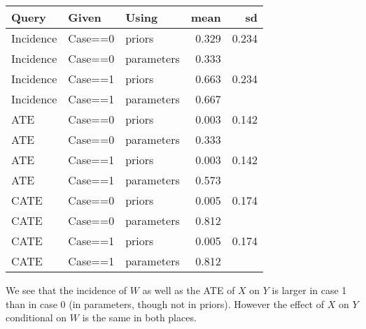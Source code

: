 \documentclass[
  12pt,
]{book}
\newenvironment{Shaded}{\begin{snugshade}}{\end{snugshade}}
\newcommand{\DataTypeTok}[1]{\textcolor[rgb]{0.13,0.29,0.53}{#1}}
\newcommand{\KeywordTok}[1]{\textcolor[rgb]{0.13,0.29,0.53}{\textbf{#1}}}
\newcommand{\NormalTok}[1]{#1}
\newcommand{\OperatorTok}[1]{\textcolor[rgb]{0.81,0.36,0.00}{\textbf{#1}}}
\newcommand{\OtherTok}[1]{\textcolor[rgb]{0.56,0.35,0.01}{#1}}
\newcommand{\StringTok}[1]{\textcolor[rgb]{0.31,0.60,0.02}{#1}}
\begin{document}
\begin{Shaded}
\end{Shaded}

\begin{tabular}{l|l|l|r|r}
\hline
Query & Given & Using & mean & sd\\
\hline
Incidence & Case==0 & priors & 0.329 & 0.234\\
\hline
Incidence & Case==0 & parameters & 0.333 & \\
\hline
Incidence & Case==1 & priors & 0.663 & 0.234\\
\hline
Incidence & Case==1 & parameters & 0.667 & \\
\hline
ATE & Case==0 & priors & 0.003 & 0.142\\
\hline
ATE & Case==0 & parameters & 0.333 & \\
\hline
ATE & Case==1 & priors & 0.003 & 0.142\\
\hline
ATE & Case==1 & parameters & 0.573 & \\
\hline
CATE & Case==0 & priors & 0.005 & 0.174\\
\hline
CATE & Case==0 & parameters & 0.812 & \\
\hline
CATE & Case==1 & priors & 0.005 & 0.174\\
\hline
CATE & Case==1 & parameters & 0.812 & \\
\hline
\end{tabular}

We see that the incidence of \(W\) as well as the ATE of \(X\) on \(Y\) is larger in case 1 than in case 0 (in parameters, though not in priors). However the effect of \(X\) on \(Y\) conditional on \(W\) is the same in both places.
\end{document}
